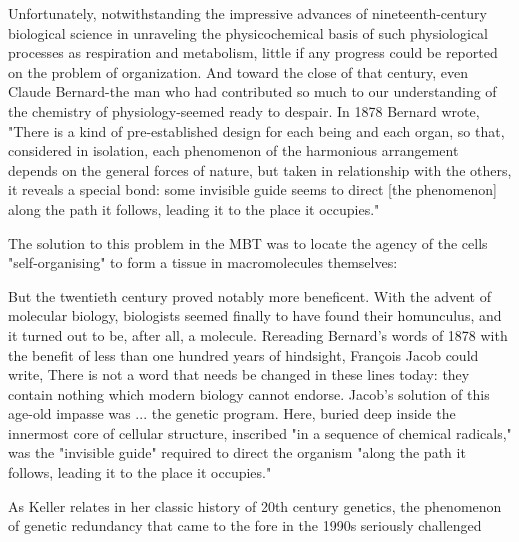 \begin{longquote}
Unfortunately, notwithstanding the impressive advances
of nineteenth-century biological science in unraveling the
physicochemical basis of such physiological processes as respiration and metabolism, little if any progress could be reported on the problem of organization. And toward the
close of that century, even Claude Bernard-the man who
had contributed so much to our understanding of the
chemistry of physiology-seemed ready to despair. In 1878
Bernard wrote, "There is a kind of pre-established design for
each being and each organ, so that, considered in isolation,
each phenomenon of the harmonious arrangement depends
on the general forces of nature, but taken in relationship
with the others, it reveals a special bond: some invisible
guide seems to direct [the phenomenon] along the path it
follows, leading it to the place it occupies."
\cite[p.108]{Keller2000}
\end{longquote}

The solution to this problem in the MBT was to locate the agency of the cells "self-organising" to form a tissue in macromolecules themselves:

\begin{longquote}
But the twentieth century proved notably more beneficent. With the advent of molecular biology, biologists seemed finally to have found their homunculus, and it
turned out to be, after all, a molecule. Rereading Bernard’s
words of 1878 with the benefit of less than one hundred
years of hindsight, François Jacob could write, 
There is not a word that needs be changed in these lines today: they contain nothing which modern biology cannot endorse.
 Jacob’s solution of this age-old impasse was ... the genetic program. Here, buried deep inside the innermost core of cellular structure, inscribed "in a sequence of chemical radicals," was the "invisible guide" required to direct the organism "along the path it follows,
leading it to the place it occupies."
\cite[p.109]{Keller2000}
\end{longquote}

As Keller relates in her classic history of 20th century genetics, the phenomenon of genetic redundancy that came to the fore in the 1990s seriously challenged


